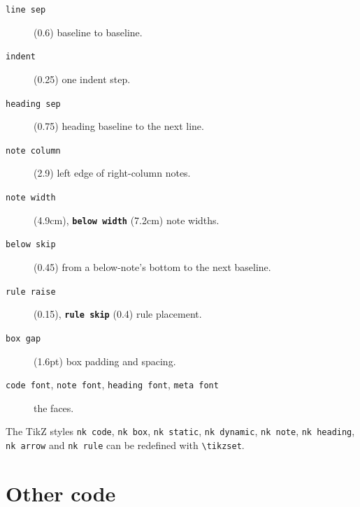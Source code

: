 \documentclass{article}
\begin{document}
\begin{description}
\item[\texttt{line sep}] (0.6) baseline to baseline.
\item[\texttt{indent}] (0.25) one indent step.
\item[\texttt{heading sep}] (0.75) heading baseline to the next line.
\item[\texttt{note column}] (2.9) left edge of right-column notes.
\item[\texttt{note width}] (4.9cm), \textbf{\texttt{below width}} (7.2cm) note widths.
\item[\texttt{below skip}] (0.45) from a below-note's bottom to the next baseline.
\item[\texttt{rule raise}] (0.15), \textbf{\texttt{rule skip}} (0.4) rule placement.
\item[\texttt{box gap}] (1.6pt) box padding and spacing.
\item[\texttt{code font}, \texttt{note font}, \texttt{heading font}, \texttt{meta font}] the faces.
\end{description}

\noindent The TikZ styles \texttt{nk code}, \texttt{nk box}, \texttt{nk static},
\texttt{nk dynamic}, \texttt{nk note}, \texttt{nk heading}, \texttt{nk arrow} and
\texttt{nk rule} can be redefined with \texttt{\textbackslash tikzset}.

\section{Other code}

\begin{center}
\begin{nockmark}[note column=5.2, note width=5cm]
\end{nockmark}
\end{center}
\end{document}
